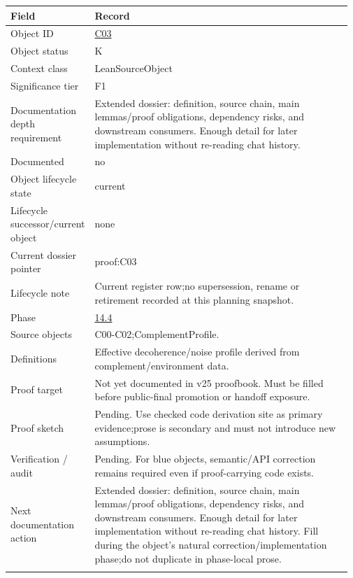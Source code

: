 \begin{longtable}{L{0.16\linewidth} L{0.81\linewidth}}
\hline
\textbf{Field} & \textbf{Record}\\
\hline
Object ID & \hyperlink{object-row-C03}{C03}\\
\hline\addlinespace[0.20em]
Object status & K\\
\hline\addlinespace[0.20em]
Context class & LeanSourceObject\\
\hline\addlinespace[0.20em]
Significance tier & F1\\
\hline\addlinespace[0.20em]
Documentation depth requirement & Extended dossier: definition, source chain, main lemmas/\allowbreak{}proof obligations, dependency risks, and downstream consumers. Enough detail for later implementation without re-reading chat history.\\
\hline\addlinespace[0.20em]
Documented & no\\
\hline\addlinespace[0.20em]
Object lifecycle state & current\\
\hline\addlinespace[0.20em]
Lifecycle successor/\allowbreak{}current object & none\\
\hline\addlinespace[0.20em]
Current dossier pointer & proof:C03\\
\hline\addlinespace[0.20em]
Lifecycle note & Current register row;\newline no supersession, rename or retirement recorded at this planning snapshot.\\
\hline\addlinespace[0.20em]
Phase & \hyperlink{phase-row-14-4}{14.4}\\
\hline\addlinespace[0.20em]
Source objects & C00-C02;\newline ComplementProfile.\\
\hline\addlinespace[0.20em]
Definitions & Effective decoherence/\allowbreak{}noise profile derived from complement/\allowbreak{}environment data.\\
\hline\addlinespace[0.20em]
Proof target & Not yet documented in v25 proofbook. Must be filled before public-final promotion or handoff exposure.\\
\hline\addlinespace[0.20em]
Proof sketch & Pending. Use checked code derivation site as primary evidence;\newline prose is secondary and must not introduce new assumptions.\\
\hline\addlinespace[0.20em]
Verification /\allowbreak{} audit & Pending. For blue objects, semantic/\allowbreak{}API correction remains required even if proof-carrying code exists.\\
\hline\addlinespace[0.20em]
Next documentation action & Extended dossier: definition, source chain, main lemmas/\allowbreak{}proof obligations, dependency risks, and downstream consumers. Enough detail for later implementation without re-reading chat history. Fill during the object's natural correction/\allowbreak{}implementation phase;\newline do not duplicate in phase-local prose.\\
\hline\addlinespace[0.20em]
\end{longtable}
